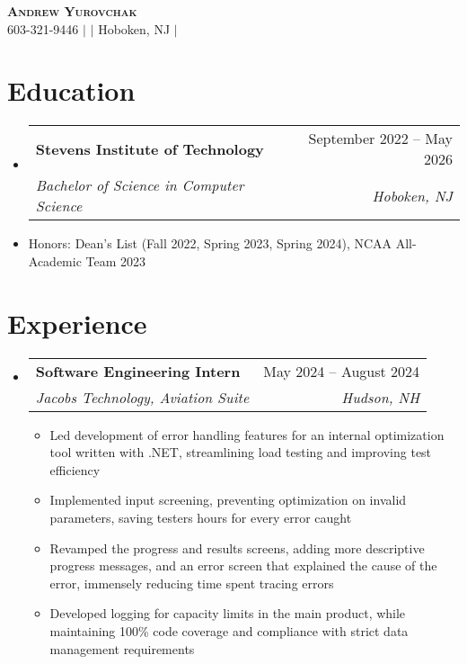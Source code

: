 \documentclass[letterpaper,11pt]{article}
\makeatletter
\newcommand{\resumeItem}[1]{
  \item\small{
    {#1 \vspace{-2pt}}
  }
}
\newcommand{\resumeSubheading}[4]{
  \vspace{-2pt}\item
    \begin{tabular*}{0.97\textwidth}[t]{l@{\extracolsep{\fill}}r}
      \textbf{#1} & #2 \\
      \textit{\small#3} & \textit{\small #4} \\
    \end{tabular*}\vspace{-7pt}
}
\newcommand{\resumeSubItem}[1]{\resumeItem{#1}\vspace{-4pt}}
\newcommand{\resumeSubHeadingListStart}{\begin{itemize}[leftmargin=0.15in, label={}]}
\newcommand{\resumeSubHeadingListEnd}{\end{itemize}}
\newcommand{\resumeItemListStart}{\begin{itemize}}
\newcommand{\resumeItemListEnd}{\end{itemize}\vspace{-5pt}}
\makeatother
\begin{document}

\begin{center}
    \textbf{\Huge \scshape Andrew Yurovchak} \\ \vspace{3pt}
    \small 603-321-9446 $|$ \href{mailto:andy@yurovchak.net}{\underline{}} $|$ \small{Hoboken, NJ} $|$
    \href{https://portfolio.super-youtube.com}{\underline{}} \\ \vspace{-3pt}
\end{center}


\section{Education}
  \resumeSubHeadingListStart
    \resumeSubheading
      {Stevens Institute of Technology}{September 2022 -- May 2026}
      {Bachelor of Science in Computer Science}{Hoboken, NJ}
    \resumeSubItem{Honors: Dean's List (Fall 2022, Spring 2023, Spring 2024), NCAA All-Academic Team 2023}
  \resumeSubHeadingListEnd


\section{Experience}
  \resumeSubHeadingListStart

    \resumeSubheading
      {Software Engineering Intern}{May 2024 -- August 2024}
      {Jacobs Technology, Aviation Suite}{Hudson, NH}
      \resumeItemListStart
        \resumeItem{Led development of error handling features for an internal optimization tool written with .NET, streamlining load testing and improving test efficiency}
        \resumeItem{Implemented input screening, preventing optimization on invalid parameters, saving testers hours for every error caught}
        \resumeItem{Revamped the progress and results screens, adding more descriptive progress messages, and an error screen that explained the cause of the error, immensely reducing time spent tracing errors}
        \resumeItem{Developed logging for capacity limits in the main product, while maintaining 100\% code coverage and compliance with strict data management requirements}
      \resumeItemListEnd
    \resumeSubHeadingListEnd
      
\end{document}
